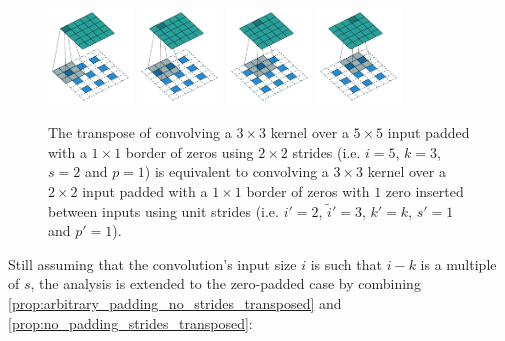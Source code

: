 \documentclass{article}
\begin{document}
\begin{figure}[h]
    \centering
    \includegraphics[width=0.2\textwidth]{pdf/padding_strides_transposed_00.pdf}
    \includegraphics[width=0.2\textwidth]{pdf/padding_strides_transposed_01.pdf}
    \includegraphics[width=0.2\textwidth]{pdf/padding_strides_transposed_02.pdf}
    \includegraphics[width=0.2\textwidth]{pdf/padding_strides_transposed_03.pdf}
    \caption{\label{fig:padding_strides_transposed} The transpose of convolving
        a $3 \times 3$ kernel over a $5 \times 5$ input padded with a $1 \times
        1$ border of zeros using $2 \times 2$ strides (i.e. $i = 5$, $k = 3$, $s
        = 2$ and $p = 1$) is equivalent to convolving a $3 \times 3$ kernel over
        a $2 \times 2$ input padded with a $1 \times 1$ border of zeros with $1$
        zero inserted between inputs using unit strides (i.e. $i' = 2$,
        $\tilde{i}' = 3$, $k' = k$, $s' = 1$ and $p' = 1$).}
\end{figure}

Still assuming that the convolution's input size $i$ is such that $i - k$ is a
multiple of $s$, the analysis is extended to the zero-padded case by combining
\autoref{prop:arbitrary_padding_no_strides_transposed} and
\autoref{prop:no_padding_strides_transposed}:
\end{document}
